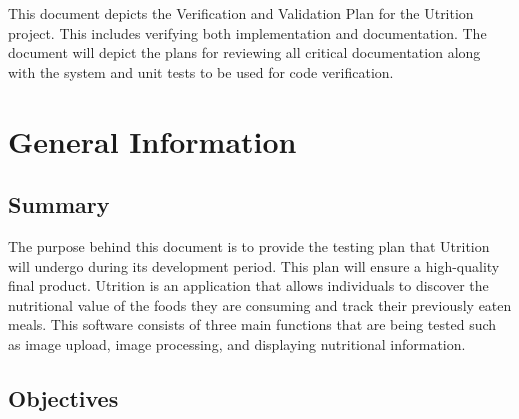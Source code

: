 \documentclass[12pt, titlepage]{article}
\begin{document}
	
	
	\newpage
	
	
	This document depicts the Verification and Validation Plan for the Utrition project. This includes verifying both implementation and documentation. The document will depict the plans for reviewing all critical documentation along with the system and unit tests to be used for code verification.  
	
	\section{General Information}
	
	\subsection{Summary}
	
		The purpose behind this document is to provide the testing plan that Utrition will undergo during its development period. This plan will ensure a high-quality final product. Utrition is an application that allows individuals to discover the nutritional value of the foods they are consuming and track their previously eaten meals. This software consists of three main functions that are being tested such as image upload, image processing, and displaying nutritional information.
	
	\subsection{Objectives}
	
		
\end{document}
